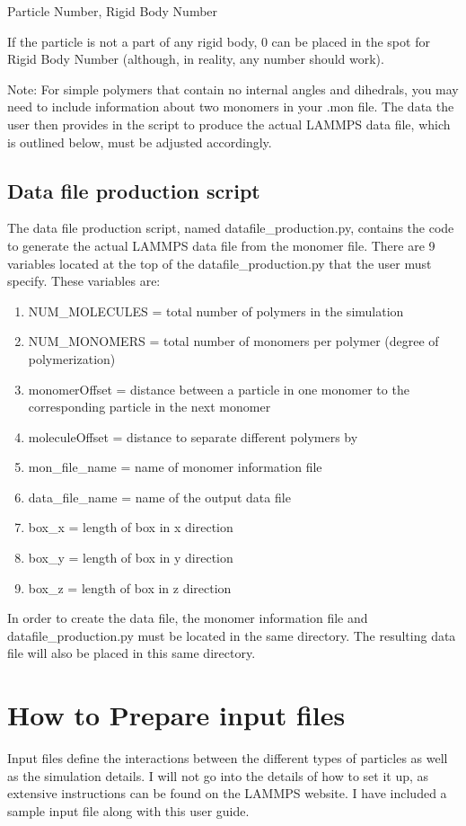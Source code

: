 \documentclass{article}
\begin{document}
Particle Number, Rigid Body Number

If the particle is not a part of any rigid body, 0 can be placed in the spot for Rigid Body Number (although, in reality, any number should work).

Note: For simple polymers that contain no internal angles and dihedrals, you may need to include information about two monomers in your .mon file. The data the user then provides in the script to produce the actual LAMMPS data file, which is outlined below, must be adjusted accordingly.

\subsection{Data file production script}
The data file production script, named datafile\_production.py, contains the code to generate the actual LAMMPS data file from the monomer file. There are 9 variables located at the top of the datafile\_production.py that the user must specify. These variables are:
\begin{enumerate}
    \item NUM\_MOLECULES = total number of polymers in the simulation
    \item NUM\_MONOMERS = total number of monomers per polymer (degree of polymerization)
    \item monomerOffset = distance between a particle in one monomer to the corresponding particle in the next monomer
    \item moleculeOffset = distance to separate different polymers by
    \item mon\_file\_name = name of monomer information file
    \item data\_file\_name = name of the output data file
    \item box\_x = length of box in x direction
    \item box\_y = length of box in y direction
    \item box\_z = length of box in z direction
\end{enumerate}

In order to create the data file, the monomer information file and
\newline
datafile\_production.py must be located in the same directory. The resulting data file will also be placed in this same directory.

\section{How to Prepare input files}
Input files define the interactions between the different types of particles as well as the simulation details. I will not go into the details of how to set it up, as extensive instructions can be found on the LAMMPS website. I have included a sample input file along with this user guide.
\end{document}

